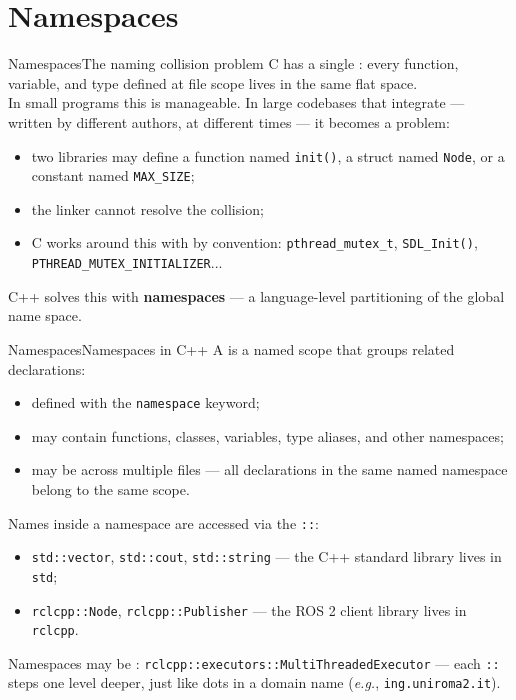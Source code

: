 
\section{Namespaces}
\graphicspath{{figs/namespaces/}}

\begin{frame}{Namespaces}{The naming collision problem}
	\justifying
	C has a single : every function, variable, and type defined at file scope lives in the same flat space.\\
	\bigskip
	In small programs this is manageable. In large codebases that integrate  — written by different authors, at different times — it becomes a problem:
	\begin{itemize}
		\item two libraries may define a function named \texttt{init()}, a struct named \texttt{Node}, or a constant named \texttt{MAX\_SIZE};
		\item the linker cannot resolve the collision;
		\item C works around this with  by convention: \texttt{pthread\_mutex\_t}, \texttt{SDL\_Init()}, \texttt{PTHREAD\_MUTEX\_INITIALIZER}...
	\end{itemize}
	\bigskip
	\begin{block}{}
		\centering
		C++ solves this with \textbf{namespaces} — a language-level partitioning of the global name space.
	\end{block}
\end{frame}

\begin{frame}{Namespaces}{Namespaces in C++}
	\justifying
	A  is a named scope that groups related declarations:
	\begin{itemize}
		\item defined with the \texttt{namespace} keyword;
		\item may contain functions, classes, variables, type aliases, and other namespaces;
		\item may be  across multiple files — all declarations in the same named namespace belong to the same scope.
	\end{itemize}
	\bigskip
	Names inside a namespace are accessed via the  \texttt{::}:
	\begin{itemize}
		\item \texttt{std::vector}, \texttt{std::cout}, \texttt{std::string} — the C++ standard library lives in \texttt{std};
		\item \texttt{rclcpp::Node}, \texttt{rclcpp::Publisher} — the ROS 2 client library lives in \texttt{rclcpp}.
	\end{itemize}
	\bigskip
	Namespaces may be : \texttt{rclcpp::executors::MultiThreadedExecutor} — each \texttt{::} steps one level deeper, just like dots in a domain name (\emph{e.g.}, \texttt{ing.uniroma2.it}).
\end{frame}

